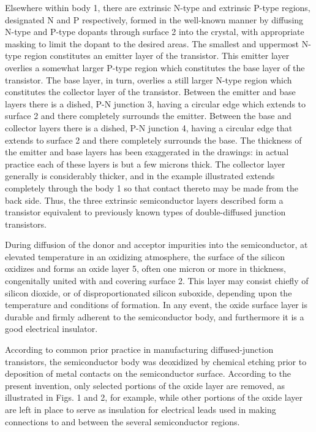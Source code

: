 Elsewhere within body 1, there are extrinsic N-type and extrinsic P-type regions, designated N and P respectively, formed in the well-known manner by diffusing N-type and P-type dopants through surface 2 into the crystal, with appropriate masking to limit the dopant to the desired areas. The smallest and uppermost N-type region constitutes an emitter layer of the transistor. This emitter layer overlies a somewhat larger P-type region which constitutes the base layer of the transistor. The base layer, in turn, overlies a still larger N-type region which constitutes the collector layer of the transistor. Between the emitter and base layers there is a dished, P-N junction 3, having a circular edge which extends to surface 2 and there completely surrounds the emitter. Between the base and collector layers there is a dished, P-N junction 4, having a circular edge that extends to surface 2 and there completely surrounds the base. The thickness of the emitter and base layers has been exaggerated in the drawings: in actual practice each of these layers is but a few microns thick. The collector layer generally is considerably thicker, and in the example illustrated extends completely through the body 1 so that contact thereto may be made from the back side. Thus, the three extrinsic semiconductor layers described form a transistor equivalent to previously known types of double-diffused junction transistors.

During diffusion of the donor and acceptor impurities into the semiconductor, at elevated temperature in an oxidizing atmosphere, the surface of the silicon oxidizes and forms an oxide layer 5, often one micron or more in thickness, congenitally united with and covering surface 2. This layer may consist chiefly of silicon dioxide, or of disproportionated silicon suboxide, depending upon the temperature and conditions of formation. In any event, the oxide surface layer is durable and firmly adherent to the semiconductor body, and furthermore it is a good electrical insulator.

According to common prior practice in manufacturing diffused-junction transistors, the semiconductor body was deoxidized by chemical etching prior to deposition of metal contacts on the semiconductor surface. According to the present invention, only selected portions of the oxide layer are removed, as illustrated in Figs. 1 and 2, for example, while other portions of the oxide layer are left in place to serve as insulation for electrical leads used in making connections to and between the several semiconductor regions.

